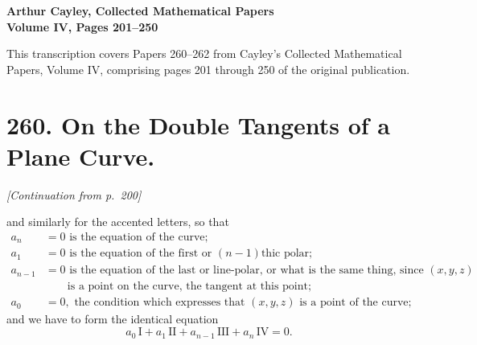 \documentclass[12pt,a4paper]{article}
\theoremstyle{plain}
\begin{document}
\begin{center}
\Large\textbf{Arthur Cayley, Collected Mathematical Papers}\\[6pt]
\large\textbf{Volume IV, Pages 201--250}
\end{center}

\vspace{1em}
\noindent
This transcription covers Papers 260--262 from Cayley's Collected Mathematical Papers,
Volume IV, comprising pages 201 through 250 of the original publication.

\vspace{2em}


\newpage
\section*{260. On the Double Tangents of a Plane Curve.}
\label{sec:paper260}


\medskip

\noindent\textit{[Continuation from p.~200]}

\medskip

and  similarly  for  the  accented  letters,  so  that 
\begin{align*}
a_n     &=  0  \text{  is  the  equation   of  the  curve} ; \\
a_1     &=  0  \text{  is  the  equation  of  the  first  or  $(n-1)$thic  polar} ; \\
a_{n-1} &=  0  \text{  is  the  equation  of  the  last  or  line-polar,  or  what  is  the  same  thing,  since  $(x, y, z)$} \\
        &\qquad\text{is  a  point   on  the  curve,  the  tangent  at  this  point} ; \\
a_0     &=  0, \text{  the  condition  which  expresses  that  $(x, y, z)$  is  a  point  of  the  curve} ;
\end{align*}
and  we  have  to  form  the  identical  equation
\[
a_0 \, \mathrm{I} + a_1 \, \mathrm{II} + a_{n-1} \, \mathrm{III} + a_n \, \mathrm{IV} = 0.
\]
\end{document}
